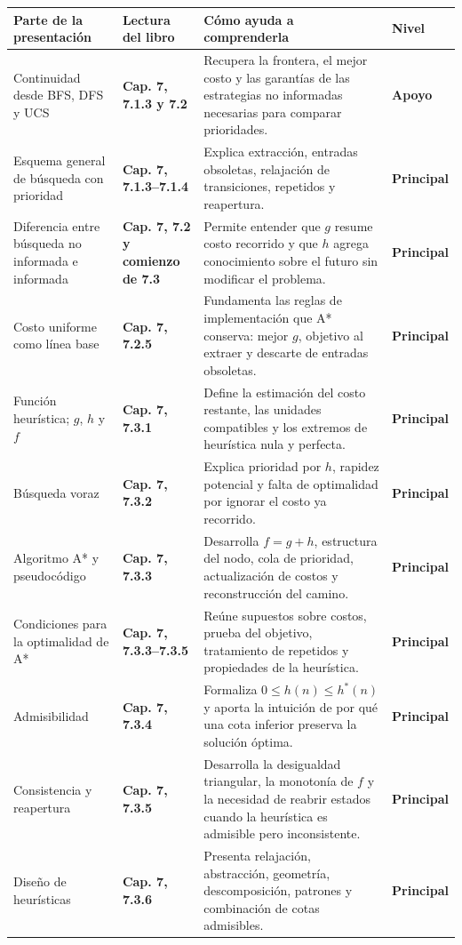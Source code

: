 \documentclass[10pt,a4paper]{article}
\newcommand{\capitulo}[1]{\textbf{\color{UAPTeal}#1}}
\newcommand{\principal}{\textbf{Principal}}
\newcommand{\apoyo}{\textbf{Apoyo}}
\newcommand{\encabezadotabla}{%
  \rowcolor{UAPNavy}
  \color{white}\textbf{Parte de la presentación} &
  \color{white}\textbf{Lectura del libro} &
  \color{white}\textbf{Cómo ayuda a comprenderla} &
  \color{white}\textbf{Nivel} \\
  \endhead
}
\begin{document}
\begin{longtable}{P{3.35cm}P{4.05cm}P{6.25cm}P{2.15cm}}
\toprule
\encabezadotabla
\midrule
Continuidad desde BFS, DFS y UCS & \capitulo{Cap. 7, 7.1.3 y 7.2} & Recupera la frontera, el mejor costo y las garantías de las estrategias no informadas necesarias para comparar prioridades. & \apoyo \\
Esquema general de búsqueda con prioridad & \capitulo{Cap. 7, 7.1.3--7.1.4} & Explica extracción, entradas obsoletas, relajación de transiciones, repetidos y reapertura. & \principal \\
Diferencia entre búsqueda no informada e informada & \capitulo{Cap. 7, 7.2 y comienzo de 7.3} & Permite entender que $g$ resume costo recorrido y que $h$ agrega conocimiento sobre el futuro sin modificar el problema. & \principal \\
Costo uniforme como línea base & \capitulo{Cap. 7, 7.2.5} & Fundamenta las reglas de implementación que A* conserva: mejor $g$, objetivo al extraer y descarte de entradas obsoletas. & \principal \\
Función heurística; $g$, $h$ y $f$ & \capitulo{Cap. 7, 7.3.1} & Define la estimación del costo restante, las unidades compatibles y los extremos de heurística nula y perfecta. & \principal \\
Búsqueda voraz & \capitulo{Cap. 7, 7.3.2} & Explica prioridad por $h$, rapidez potencial y falta de optimalidad por ignorar el costo ya recorrido. & \principal \\
Algoritmo A* y pseudocódigo & \capitulo{Cap. 7, 7.3.3} & Desarrolla $f=g+h$, estructura del nodo, cola de prioridad, actualización de costos y reconstrucción del camino. & \principal \\
Condiciones para la optimalidad de A* & \capitulo{Cap. 7, 7.3.3--7.3.5} & Reúne supuestos sobre costos, prueba del objetivo, tratamiento de repetidos y propiedades de la heurística. & \principal \\
Admisibilidad & \capitulo{Cap. 7, 7.3.4} & Formaliza $0\le h(n)\le h^*(n)$ y aporta la intuición de por qué una cota inferior preserva la solución óptima. & \principal \\
Consistencia y reapertura & \capitulo{Cap. 7, 7.3.5} & Desarrolla la desigualdad triangular, la monotonía de $f$ y la necesidad de reabrir estados cuando la heurística es admisible pero inconsistente. & \principal \\
Diseño de heurísticas & \capitulo{Cap. 7, 7.3.6} & Presenta relajación, abstracción, geometría, descomposición, patrones y combinación de cotas admisibles. & \principal \\

\end{longtable}
\end{document}
